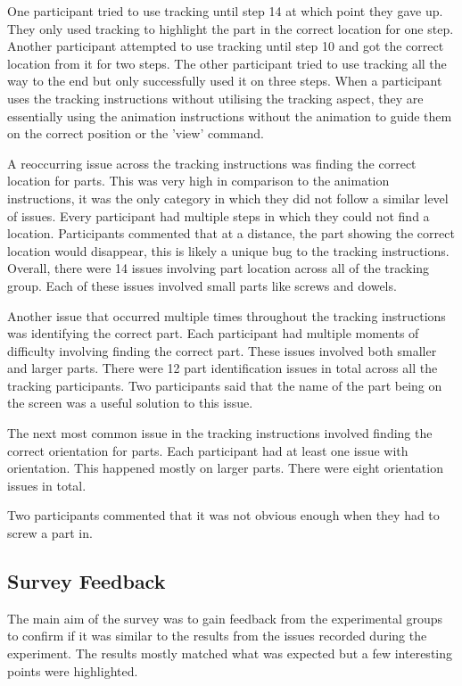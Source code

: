 \documentclass{l4proj}
\begin{document}
One participant tried to use tracking until step 14 at which point they gave up. They only used tracking to highlight the part in the correct location for one step. Another participant attempted to use tracking until step 10 and got the correct location from it for two steps. The other participant tried to use tracking all the way to the end but only successfully used it on three steps. When a participant uses the tracking instructions without utilising the tracking aspect, they are essentially using the animation instructions without the animation to guide them on the correct position or the 'view' command.

A reoccurring issue across the tracking instructions was finding the correct location for parts. This was very high in comparison to the animation instructions, it was the only category in which they did not follow a similar level of issues. Every participant had multiple steps in which they could not find a location. Participants commented that at a distance, the part showing the correct location would disappear, this is likely a unique bug to the tracking instructions. Overall, there were 14 issues involving part location across all of the tracking group. Each of these issues involved small parts like screws and dowels. 

Another issue that occurred multiple times throughout the tracking instructions was identifying the correct part. Each participant had multiple moments of difficulty involving finding the correct part. These issues involved both smaller and larger parts. There were 12 part identification issues in total across all the tracking participants. Two participants said that the name of the part being on the screen was a useful solution to this issue.

The next most common issue in the tracking instructions involved finding the correct orientation for parts. Each participant had at least one issue with orientation. This happened mostly on larger parts. There were eight orientation issues in total.

Two participants commented that it was not obvious enough when they had to screw a part in.

\subsection{Survey Feedback}

The main aim of the survey was to gain feedback from the experimental groups to confirm if it was similar to the results from the issues recorded during the experiment. The results mostly matched what was expected but a few interesting points were highlighted.
\end{document}
